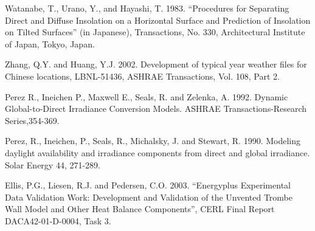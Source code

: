 Watanabe, T., Urano, Y., and Hayashi, T. 1983. ``Procedures for Separating Direct and Diffuse Insolation on a Horizontal Surface and Prediction of Insolation on Tilted Surfaces'' (in Japanese), Transactions, No. 330, Architectural Institute of Japan, Tokyo, Japan.

Zhang, Q.Y. and Huang, Y.J. 2002. Development of typical year weather files for Chinese locations, LBNL-51436, ASHRAE Transactions, Vol. 108, Part 2.

Perez R., Ineichen P., Maxwell E., Seals, R. and Zelenka, A. 1992. Dynamic Global-to-Direct Irradiance Conversion Models. ASHRAE Transactions-Research Series,354-369.

Perez, R., Ineichen, P., Seals, R., Michalsky, J. and Stewart, R. 1990. Modeling daylight availability and irradiance components from direct and global irradiance. Solar Energy 44, 271-289.

Ellis, P.G., Liesen, R.J. and Pedersen, C.O. 2003. ``Energyplus Experimental Data Validation Work: Development and Validation of the Unvented Trombe Wall Model and Other Heat Balance Components'', CERL Final Report DACA42-01-D-0004, Task 3.
